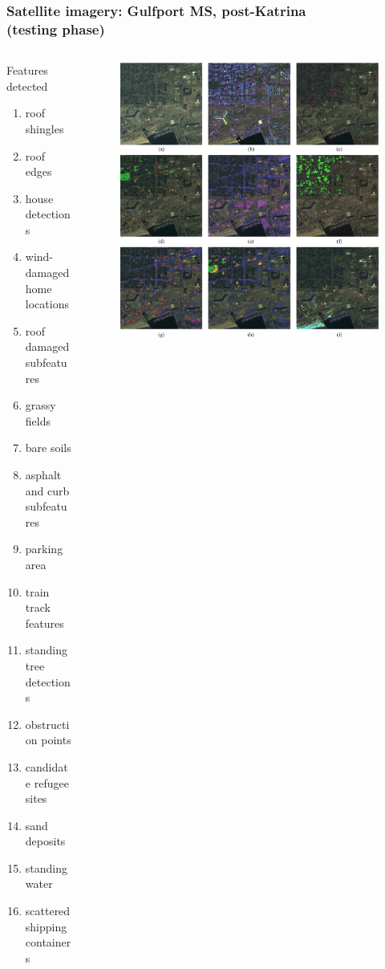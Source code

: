 \begin{frame}[plain]
\frametitle{\small Satellite imagery: Gulfport MS, post-Katrina\\(testing phase)}
\mypagenum
	\begin{columns}
		\begin{column}{0.8in}
			\begin{changemargin}{-1.3in}{0in}
				Features detected
				\begin{enumerate}\small
					\item roof shingles
					\item roof edges
					\item house detections
					\item wind-damaged home locations
					\item roof damaged subfeatures
					\item grassy fields
					\item bare soils
					\item asphalt and curb subfeatures
					\item parking area
					\item train track features
					\item standing tree detections
					\item obstruction points
					\item candidate refugee sites
					\item sand deposits
					\item standing water
					\item scattered shipping containers
				\end{enumerate}
			\end{changemargin}
		\end{column}
	\begin{column}{2.8in}
			\begin{figure}		
				\includegraphics[height=0.8\textheight]{figs/RVQ_SatelliteKatrina_3_labeling.png}

\end{figure}
\end{column}
\end{columns}
\end{frame}
